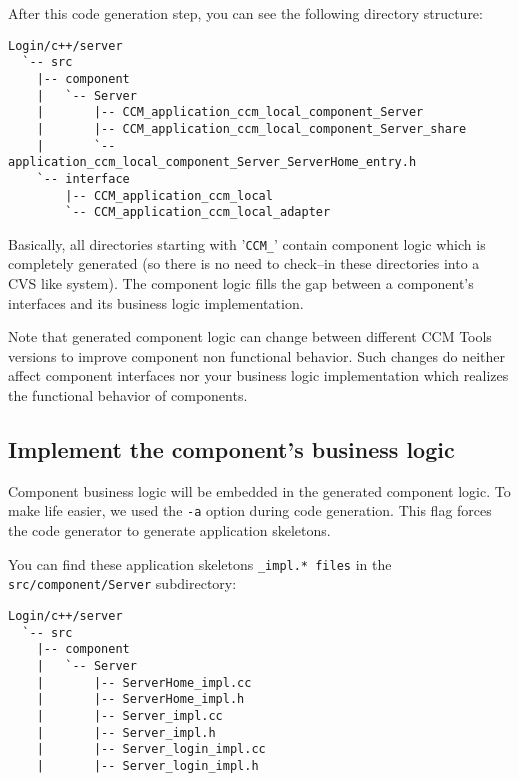 After this code generation step, you can see the following directory structure:
\begin{footnotesize}
\begin{verbatim}
Login/c++/server
  `-- src
    |-- component
    |   `-- Server
    |       |-- CCM_application_ccm_local_component_Server
    |       |-- CCM_application_ccm_local_component_Server_share
    |       `-- application_ccm_local_component_Server_ServerHome_entry.h
    `-- interface
        |-- CCM_application_ccm_local
        `-- CCM_application_ccm_local_adapter
\end{verbatim}
\end{footnotesize}

Basically, all directories starting with '{\tt CCM\_}' contain component logic
which is completely generated (so there is no need to check--in these directories
into a CVS like system).
The component logic fills the gap between a component's interfaces and its
business logic implementation. 

\vspace{3mm}
Note that generated component logic can change between different CCM Tools
versions to improve component non functional behavior. Such changes do neither
affect component interfaces nor your business logic implementation which
realizes the functional behavior of components.   


\subsection{Implement the component's business logic}
\label{subsection:ImplementC++BusinessLogic}

Component business logic will be embedded in the generated component logic.
To make life easier, we used the {\tt -a} option during code generation.
This flag forces the code generator to generate application skeletons.

\vspace{3mm}
You can find these application skeletons {\tt *\_impl.* files} in the 
{\tt src/component/Server} subdirectory:
\begin{footnotesize}
\begin{verbatim}
Login/c++/server
  `-- src
    |-- component
    |   `-- Server
    |       |-- ServerHome_impl.cc
    |       |-- ServerHome_impl.h
    |       |-- Server_impl.cc
    |       |-- Server_impl.h
    |       |-- Server_login_impl.cc
    |       |-- Server_login_impl.h
\end{verbatim}
\end{footnotesize}

